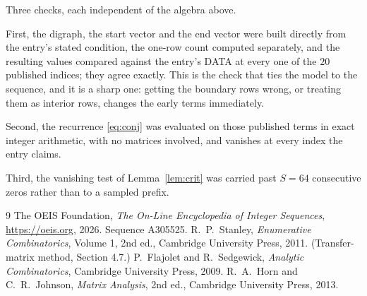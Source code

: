 \documentclass[11pt,a4paper]{article}
\theoremstyle{plain}
\theoremstyle{definition}
\begin{document}
Three checks, each independent of the algebra above.

First, the digraph, the start vector and the end vector were built directly from the
entry's stated condition, the one-row count computed separately, and the resulting values
compared against the entry's DATA at every one of the $20$ published indices; they
agree exactly. This is the check that ties the model to the sequence, and it is a sharp one:
getting the boundary rows wrong, or treating them as interior rows, changes the early terms
immediately.

Second, the recurrence \eqref{eq:conj} was evaluated on those published terms in exact
integer arithmetic, with no matrices involved, and vanishes at every index the entry claims.

Third, the vanishing test of Lemma~\ref{lem:crit} was carried past $S=64$ consecutive
zeros rather than to a sampled prefix.

\begin{thebibliography}{9}
 The OEIS Foundation, \emph{The On-Line Encyclopedia of Integer
Sequences}, \url{https://oeis.org}, 2026. Sequence A305525.
 R.~P.~Stanley, \emph{Enumerative Combinatorics}, Volume 1, 2nd ed.,
Cambridge University Press, 2011. (Transfer-matrix method, Section 4.7.)
 P.~Flajolet and R.~Sedgewick, \emph{Analytic Combinatorics}, Cambridge
University Press, 2009.
 R.~A.~Horn and C.~R.~Johnson, \emph{Matrix Analysis}, 2nd ed., Cambridge
University Press, 2013.
\end{thebibliography}
\end{document}
